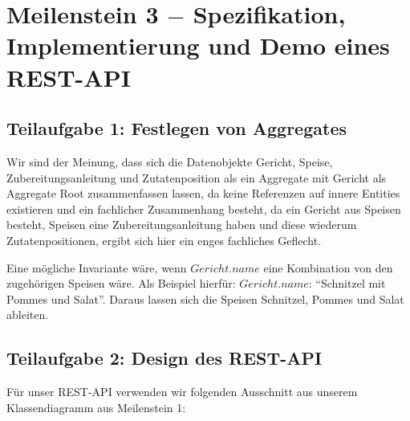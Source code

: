 \section{Meilenstein 3 $-$ Spezifikation, Implementierung
  und Demo eines REST-API}

\subsection{Teilaufgabe 1: Festlegen von Aggregates}



Wir sind der Meinung, dass sich die Datenobjekte Gericht,
Speise, Zubereitungsanleitung und Zutatenposition als ein
Aggregate mit Gericht als Aggregate Root zusammenfassen
lassen, da keine Referenzen auf innere Entities existieren
und ein fachlicher Zusammenhang besteht, da ein Gericht aus
Speisen besteht, Speisen eine Zubereitungsanleitung haben
und diese wiederum Zutatenpositionen, ergibt sich hier
ein enges fachliches Geflecht.

Eine m\"ogliche Invariante w\"are, wenn $Gericht.name$ eine
Kombination von den zugeh\"origen Speisen w\"are. Als
Beispiel hierf\"ur: $Gericht.name$: "`Schnitzel mit Pommes
und Salat"'. Daraus lassen sich die Speisen Schnitzel,
Pommes und Salat ableiten.

\subsection{Teilaufgabe 2: Design des REST-API}

F\"ur unser REST-API verwenden wir folgenden Ausschnitt aus
unserem Klassendiagramm aus Meilenstein 1:



